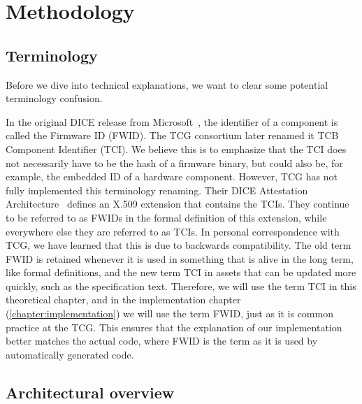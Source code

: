 
\chapter{Methodology}\label{chapter:methodology}

\section{Terminology}\label{sec:terminology}

Before we dive into technical explanations, we want to clear some potential terminology confusion.

In the original DICE release from Microsoft~\cite{England2016}, the identifier of a component is called the Firmware ID (FWID).
The TCG consortium later renamed it TCB Component Identifier (TCI).
We believe this is to emphasize that the TCI does not necessarily have to be the hash of a firmware binary, but could also be, for example, the embedded ID of a hardware component.
However, TCG has not fully implemented this terminology renaming.
Their DICE Attestation Architecture~\cite{TCGAttestation2021} defines an X.509 extension that contains the TCIs.
They continue to be referred to as FWIDs in the formal definition of this extension, while everywhere else they are referred to as TCIs.
In personal correspondence with TCG, we have learned that this is due to backwards compatibility.
The old term FWID is retained whenever it is used in something that is alive in the long term, like formal definitions, and the new term TCI in assets that can be updated more quickly, such as the specification text.
Therefore, we will use the term TCI in this theoretical chapter, and in the implementation chapter (\autoref{chapter:implementation}) we will use the term FWID, just as it is common practice at the TCG\@.
This ensures that the explanation of our implementation better matches the actual code, where FWID is the term as it is used by automatically generated code.



\section{Architectural overview}\label{sec:arch_overview}



